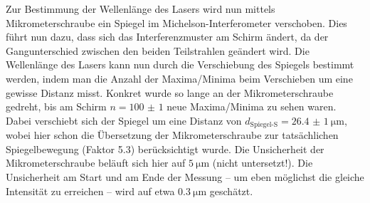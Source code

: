 \documentclass[ngerman]{scrartcl}
\begin{document}
\setcaphanging
%
Zur Bestimmung der Wellenlänge des Lasers wird nun mittels Mikrometerschraube ein Spiegel im Michelson-Interferometer verschoben. Dies führt nun dazu, dass sich das Interferenzmuster am Schirm ändert, da der Gangunterschied zwischen den beiden Teilstrahlen geändert wird. Die Wellenlänge des Lasers kann nun durch die Verschiebung des Spiegels bestimmt werden, indem man die Anzahl der Maxima/Minima beim Verschieben um eine gewisse Distanz misst. Konkret wurde so lange an der Mikrometerschraube gedreht, bis am Schirm $n = \num{100(1)}$ neue Maxima/Minima zu sehen waren. Dabei verschiebt sich der Spiegel um eine Distanz von $d_\text{Spiegel-S} = \SI{26.4(10)}{\micro\meter}$, wobei hier schon die Übersetzung der Mikrometerschraube zur tatsächlichen Spiegelbewegung (Faktor \num{5.3}) berücksichtigt wurde. Die Unsicherheit der Mikrometerschraube beläuft sich hier auf $\SI{5}{\micro\meter}$ (nicht untersetzt!). Die Unsicherheit am Start und am Ende der Messung -- um eben möglichst die gleiche Intensität zu erreichen -- wird auf etwa $\SI{0.3}{\micro\meter}$ geschätzt.
\end{document}

